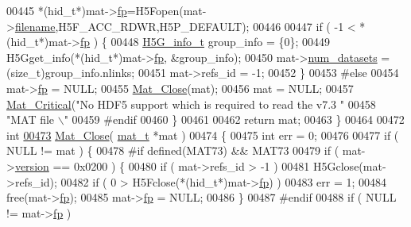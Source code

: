\begin{DoxyCode}
{{{{{{{{{{{{{{{{{{00445             *(hid\_t*)mat->\hyperlink{struct__mat__t_a85f562e407ca9ad4d2a6e14f839432b7}{fp}=H5Fopen(mat->\hyperlink{struct__mat__t_a340b191598135edd03b6dec847f0b1b1}{filename},H5F\_ACC\_RDWR,H5P\_DEFAULT);
00446 
00447         \textcolor{keywordflow}{if} ( -1 < *(hid\_t*)mat->\hyperlink{struct__mat__t_a85f562e407ca9ad4d2a6e14f839432b7}{fp} ) \{
00448             \hyperlink{struct_h5_g__info__t}{H5G\_info\_t} group\_info = \{0\};
00449             H5Gget\_info(*(hid\_t*)mat->\hyperlink{struct__mat__t_a85f562e407ca9ad4d2a6e14f839432b7}{fp}, &group\_info);
00450             mat->\hyperlink{struct__mat__t_af37d0ba323e65edb27ecd5a2f766a3a4}{num\_datasets} = (size\_t)group\_info.nlinks;
00451             mat->refs\_id      = -1;
00452         \}
00453 \textcolor{preprocessor}{#else}
00454         mat->\hyperlink{struct__mat__t_a85f562e407ca9ad4d2a6e14f839432b7}{fp} = NULL;
00455         \hyperlink{group___m_a_t_ga101c92ff7bde4a2d4615661beba09262}{Mat\_Close}(mat);
00456         mat = NULL;
00457         \hyperlink{group__mat__util_gaf51f2bfbb5580f575e4dd79757e2b80c}{Mat\_Critical}(\textcolor{stringliteral}{"No HDF5 support which is required to read the v7.3 "}
00458                      \textcolor{stringliteral}{"MAT file \(\backslash\)"%
00459 \textcolor{preprocessor}{#endif}
00460     \}
00461 
00462     \textcolor{keywordflow}{return} mat;
00463 \}
00464 
00472 \textcolor{keywordtype}{int}
\hyperlink{group___m_a_t_ga101c92ff7bde4a2d4615661beba09262}{00473} \hyperlink{group___m_a_t_ga101c92ff7bde4a2d4615661beba09262}{Mat\_Close}( \hyperlink{struct__mat__t}{mat\_t} *mat )
00474 \{
00475     \textcolor{keywordtype}{int} err = 0;
00476 
00477     \textcolor{keywordflow}{if} ( NULL != mat ) \{
00478 \textcolor{preprocessor}{#if defined(MAT73) && MAT73}
00479         \textcolor{keywordflow}{if} ( mat->\hyperlink{struct__mat__t_a729c2bc0afc97485057a5af425635b1a}{version} == 0x0200 ) \{
00480             \textcolor{keywordflow}{if} ( mat->refs\_id > -1 )
00481                 H5Gclose(mat->refs\_id);
00482             \textcolor{keywordflow}{if} ( 0 > H5Fclose(*(hid\_t*)mat->\hyperlink{struct__mat__t_a85f562e407ca9ad4d2a6e14f839432b7}{fp}) )
00483                 err = 1;
00484             free(mat->\hyperlink{struct__mat__t_a85f562e407ca9ad4d2a6e14f839432b7}{fp});
00485             mat->\hyperlink{struct__mat__t_a85f562e407ca9ad4d2a6e14f839432b7}{fp} = NULL;
00486         \}
00487 \textcolor{preprocessor}{#endif}
00488         \textcolor{keywordflow}{if} ( NULL != mat->\hyperlink{struct__mat__t_a85f562e407ca9ad4d2a6e14f839432b7}{fp} )
}}}}}}}}}}}}}}}}}}}
\end{DoxyCode}
